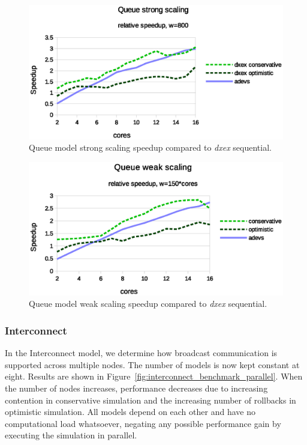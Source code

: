 \begin{figure}
	\center
	\includegraphics[width=\columnwidth]{fig/queue_fixed_strong_speedup.eps}
	\caption{Queue model strong scaling speedup compared to \textit{dxex} sequential.}
	\label{fig:Queue_plot_strong}
\end{figure}

\begin{figure}
	\center
	\includegraphics[width=\columnwidth]{fig/queue_fixed_weak_speedup.eps}
	\caption{Queue model weak scaling speedup compared to \textit{dxex} sequential.}
	\label{fig:Queue_plot_weak}
\end{figure}
	
\subsubsection{Interconnect}
\label{subsec:parallelinterconnect}
In the Interconnect model, we determine how broadcast communication is supported across multiple nodes.
The number of models is now kept constant at eight.
Results are shown in Figure~\ref{fig:interconnect_benchmark_parallel}.
When the number of nodes increases, performance decreases due to increasing contention in conservative simulation and the increasing number of rollbacks in optimistic simulation.
All models depend on each other and have no computational load whatsoever, negating any possible performance gain by executing the simulation in parallel.

